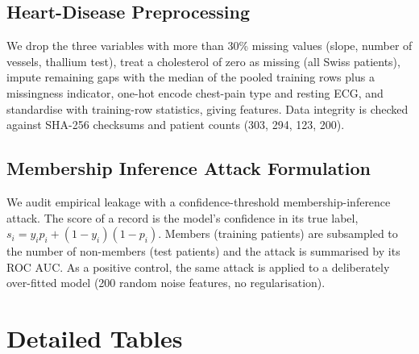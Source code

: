 \documentclass[journal]{IEEEtran}
\begin{document}
\subsection{Heart-Disease Preprocessing}
\label{sec:heart_prep}
We drop the three variables with more than 30\% missing values (slope, number of vessels, thallium test), treat a cholesterol of zero as missing (all Swiss patients), impute remaining gaps with the median of the pooled training rows plus a missingness indicator, one-hot encode chest-pain type and resting ECG, and standardise with training-row statistics, giving \hrFeat{} features. Data integrity is checked against SHA-256 checksums and patient counts (303, 294, 123, 200).

\subsection{Membership Inference Attack Formulation}
We audit empirical leakage with a confidence-threshold membership-inference attack. The score of a record is the model's confidence in its true label, $s_i = y_i p_i + (1 - y_i)(1 - p_i)$. Members (training patients) are subsampled to the number of non-members (test patients) and the attack is summarised by its ROC AUC. As a positive control, the same attack is applied to a deliberately over-fitted model (200 random noise features, no regularisation).



\section{Detailed Tables}
\label{sec:tables}








\end{document}
